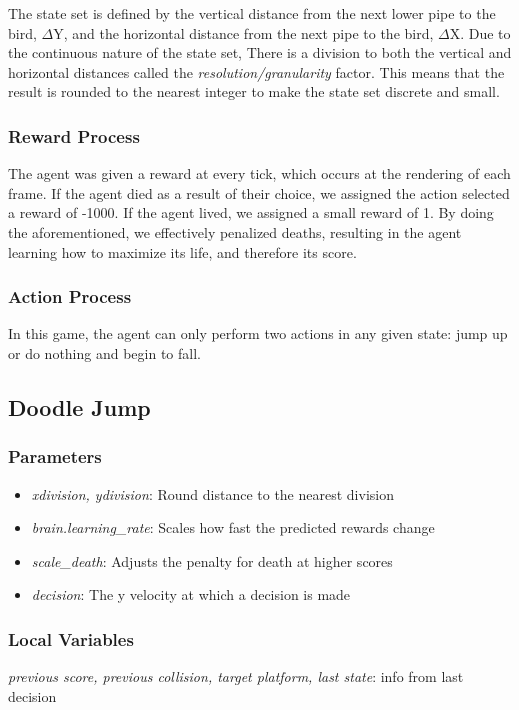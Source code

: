 \documentclass[a4paper, 12pt]{article}
\begin{document}
The state set is defined by the vertical distance from the next lower pipe to the bird, $\Delta$Y, and the horizontal distance from the next pipe to the bird, $\Delta$X. Due to the continuous nature of the state set, There is a division to both the vertical and horizontal distances called the \textit{resolution/granularity} factor. This means that the result is rounded to the nearest integer to make the state set discrete and small.

\subsubsection{Reward Process}

The agent was given a reward at every tick, which occurs at the rendering of each frame. If the agent died as a result of their choice, we assigned the action selected a reward of -1000. If the agent lived, we assigned a small reward of 1. By doing the aforementioned, we effectively penalized deaths, resulting in the agent learning how to maximize its life, and therefore its score.

\subsubsection{Action Process}

In this game, the agent can only perform two actions in any given state: jump up or do nothing and begin to fall.

\subsection{Doodle Jump}

\subsubsection{Parameters}
\begin{itemize}
	\setlength{\itemsep}{0.2pt}
	\item \textit{xdivision, ydivision}: Round distance to the nearest division
    \item \textit{brain.learning\_rate}: Scales how fast the predicted rewards change
    \item \textit{scale\_death}: Adjusts the penalty for death at higher scores
    \item \textit{decision}: The y velocity at which a decision is made
\end{itemize}
\subsubsection{Local Variables}
\textit{previous score,    previous collision,    target platform,    last state}: info from last decision
\end{document}
